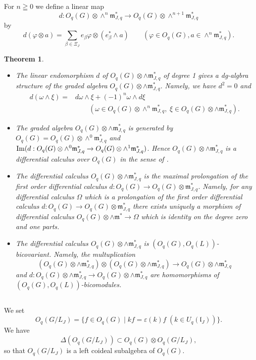 \documentclass[a4paper, 12pt, leqno]{amsart}
\newtheorem{theorem}[lemma]{{\sc Theorem}}
\theoremstyle{definition}
\numberwithin{equation}{section}
\def\Gl{{\mathfrak{l}}}
\def\Gm{{\mathfrak{m}}}
\def\Image{\mathop{\rm Im}\nolimits}
\def\m{\Gm_{J,q}}
\def\K{U_q(\Gl_J)}
\def\F{O_q(G/L_J)}
\begin{document}
For $n\geqq0$ we define a linear map
\begin{equation}
d:O_q(G)\otimes\wedge^n\m^*\to O_q(G)\otimes\wedge^{n+1}\m^*
\end{equation}
by 
\[
d(\varphi\otimes a)=\sum_{\beta\in\Xi_J}e_\beta\varphi\otimes (e^*_\beta\wedge a)
\qquad(\varphi\in O_q(G), a\in\wedge^n\m^*).
\]
\begin{theorem}
\label{thm:1}
\begin{itemize}
\item[(i)]
The linear endomorphism $d$ of $O_q(G)\otimes\wedge\m^*$ of degree 1 gives a dg-algbra structure of the graded algebra $O_q(G)\otimes\wedge\m^*$.
Namely, we have $d^2=0$ and 
\begin{align}
d(\omega\wedge \xi)=&d\omega\wedge\xi+(-1)^n \omega\wedge d\xi
\\
\nonumber
&\qquad(\omega\in O_q(G)\otimes\wedge^n\m^*,\; \xi\in
O_q(G)\otimes\wedge\m^*).
\end{align}
\item[(ii)]
The graded algebra $O_q(G)\otimes\wedge\m^*$ is generated by 
$O_q(G)=O_q(G)\otimes\wedge^0\m^*$ and 
$\Image(d:O_q(G)\otimes\wedge^0\m^*
\to O_q(G)\otimes\wedge^1\m^*)$.
Hence $O_q(G)\otimes\wedge\m^*$ is a differential calculus over $O_q(G)$ in the sense of \cite{BeM}.
\item[(iii)]
The differential calculus $O_q(G)\otimes\wedge\m^*$ is the maximal prolongation of the first order differential calculus 
$d:O_q(G)\to O_q(G)\otimes\m^*$.
Namely, for any differential calculus $\Omega$ which is a prolongation of the first order differential calculus 
$d:O_q(G)\to O_q(G)\otimes\m^*$ there exists uniquely a morphism of differential calculus $O_q(G)\otimes\wedge\Gm^*\to\Omega$ which is identity on the degree zero and one parts.

\item[(iv)] 
The differential calculus $O_q(G)\otimes\wedge\m^*$ is 
$(O_q(G),O_q(L))$-bicovariant.
Namely, the multuplication 
\[
(O_q(G)\otimes\wedge\m^*)\otimes (O_q(G)\otimes\wedge\m^*)\to O_q(G)\otimes\wedge\m^*
\]
and $d:O_q(G)\otimes\wedge\m^*\to O_q(G)\otimes\wedge\m^*$ are homomorphisms of $(O_q(G),O_q(L))$-bicomodules.
\end{itemize}
\end{theorem}
\subsection{}
We set
\[
\F=\{f\in O_q(G)\mid kf=\varepsilon(k)f\;(k\in\K)\}.
\]
We have
\[
\Delta(\F)\subset O_q(G)\otimes \F,
\]
so that $\F$ is a left coideal subalgebra of $O_q(G)$.
\end{document}
